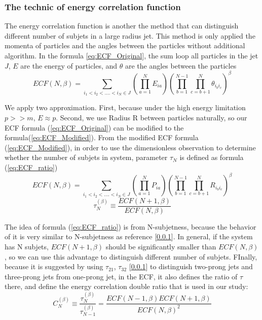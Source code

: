 \subsubsection{The technic of energy correlation function}
The energy correlation function is another the method that can distinguish different number of subjets in a large radius jet. This method is only applied the momenta of particles and the angles between the particles without additional algorithm. In the formula \ref{eq:ECF_Original}, the sum loop all particles in the jet $J$, $E$ are the energy of particles, and $\theta$ are the angles between the particles\\
\begin{equation} \label{eq:ECF_Original}
ECF(N,\beta)=\sum_{i_{1}<i_{2}<....<i_{N}\in J} (\prod_{a=1}^{N}E_{ia})(\prod_{b=1}^{N-1}\prod_{c=b+1}^{N} \theta_{i_{b}i_{c}})^{\beta}
\end{equation}

We apply two approximation. First, because under the high energy limitation $p>>m$, $E\approx p$. Second, we use Radius R between particles naturally, so our ECF formula (\ref{eq:ECF_Original}) can be modified to the formula(\ref{eq:ECF_Modified}). From the modified ECF formula (\ref{eq:ECF_Modified}), in order to use the dimensionless observation to determine whether the number of subjets in system, parameter $\tau_{N}$ is defined as formula (\ref{eq:ECF_ratio})\\ 
\begin{equation} \label{eq:ECF_Modified}
ECF(N,\beta)=\sum_{i_{1}<i_{2}<....<i_{N}\in J} (\prod_{a=1}^{N}P_{ia})(\prod_{b=1}^{N-1}\prod_{c=b+1}^{N} R_{i_{b}i_{c}})^{\beta}
\end{equation}
\begin{equation} \label{eq:ECF_ratio}
\tau_{N}^{(\beta)}\equiv\frac{ECF(N+1,\beta)}{ECF(N,\beta)}
\end{equation}

The idea of formula (\ref{eq:ECF_ratio}) is from N-subjetness, because the behavior of it is very similar to N-subjetness as reference [\ref{}]. In general, if the system has N subjets, $ECF(N+1,\beta)$ should be significantly smaller than $ECF(N,\beta)$, so we can use this advantage to distinguish different number of subjets. FInally, because it is suggested by using $\tau_{21}$, $\tau_{32}$ [\ref{}] to distinguish two-prong jets and three-prong jets from one-prong jet, in the ECF, it also defines the ratio of $\tau$ there, and define the energy correlation double ratio that is used in our study:\\
\begin{equation}
C_{N}^{(\beta)}\equiv\frac{\tau_{N}^{(\beta)}}{\tau_{N-1}^{(\beta)}}=\frac{ECF(N-1,\beta)ECF(N+1,\beta)}{ECF(N,\beta)^2}
\end{equation}

